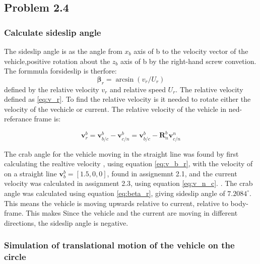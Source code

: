 
\subsection*{Problem 2.4}

\subsubsection*{Calculate sideslip angle}

The sideslip angle is as the angle from $x_b$ axis of {b} to the velocity vector of the vehicle,positive rotation about the $z_b$ axis of {b} by the right-hand screw convetion. The formmula forsideslip is therfore:
\begin{equation}
    \boldsymbol{\beta}_r = \arcsin( v_r/U_r)
    \label{eq:beta_r}
\end{equation}
defined by the relative velocity $v_r$ and relative speed $U_r$. The relative velocity defined as \eqref{eq:v_r}. To find the relative velocity is it needed to rotate either the velocity of the vechicle or current. The relative velocity of the vehicle in ned-referance frame is:

\begin{equation}
    \boldsymbol{v}^b_r = \boldsymbol{v}^b_{b/c} - \boldsymbol{v}^{b}_{c/n} =  \boldsymbol{v}^b_{b/c} - \mathbf{R}^b_n \boldsymbol{v}^{n}_{c/n} 
    \label{eq:v_b_r}
\end{equation}

The crab angle for the vehicle moving in the straight line was found by first calculating the realtive velocity , using equation \eqref{eq:v_b_r}, with  the velocity of  on a straight line  $\mathbf{v}_b^b = [1.5, 0, 0]$, found in assignemnt 2.1, and   the current velocity was calculated in assignment 2.3, using equation \eqref{eq:v_n_c}. . The crab angle was calculated using equation \eqref{eq:beta_r}, giving sideslip angle of $7.2084 ^\circ$.  This means the vehicle is moving upwards relative to current, relative to body-frame. This makes  Since the vehicle and the current are moving in different directions, the sideslip angle is negative. 

\subsubsection{Simulation of translational motion of the vehicle on the circle}

